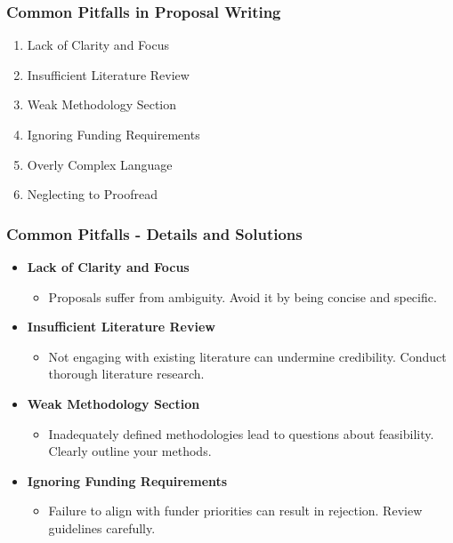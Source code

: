 \documentclass[aspectratio=169]{beamer}
\begin{document}
\begin{frame}[fragile]
    \frametitle{Common Pitfalls in Proposal Writing}
    \begin{enumerate}
        \item Lack of Clarity and Focus
        \item Insufficient Literature Review
        \item Weak Methodology Section
        \item Ignoring Funding Requirements
        \item Overly Complex Language
        \item Neglecting to Proofread
    \end{enumerate}
\end{frame}

\begin{frame}[fragile]
    \frametitle{Common Pitfalls - Details and Solutions}
    \begin{itemize}
        \item \textbf{Lack of Clarity and Focus}
            \begin{itemize}
                \item Proposals suffer from ambiguity. Avoid it by being concise and specific.
            \end{itemize}
        
        \item \textbf{Insufficient Literature Review}
            \begin{itemize}
                \item Not engaging with existing literature can undermine credibility. Conduct thorough literature research.
            \end{itemize}
        
        \item \textbf{Weak Methodology Section}
            \begin{itemize}
                \item Inadequately defined methodologies lead to questions about feasibility. Clearly outline your methods.
            \end{itemize}
        
        \item \textbf{Ignoring Funding Requirements}
            \begin{itemize}
                \item Failure to align with funder priorities can result in rejection. Review guidelines carefully.
            \end{itemize}
        

\end{itemize}
\end{frame}
\end{document}
